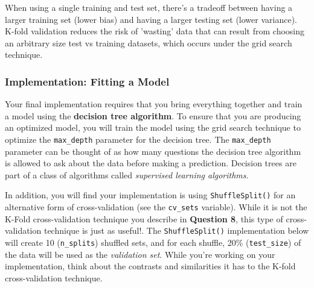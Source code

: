 \documentclass[11pt]{article}
\begin{document}
When using a single training and test set, there's a tradeoff between
having a larger training set (lower bias) and having a larger testing
set (lower variance). K-fold validation reduces the risk of 'wasting'
data that can result from choosing an arbitrary size test vs training
datasets, which occurs under the grid search technique.

    \subsubsection{Implementation: Fitting a
Model}\label{implementation-fitting-a-model}

Your final implementation requires that you bring everything together
and train a model using the \textbf{decision tree algorithm}. To ensure
that you are producing an optimized model, you will train the model
using the grid search technique to optimize the
\texttt{\textquotesingle{}max\_depth\textquotesingle{}} parameter for
the decision tree. The
\texttt{\textquotesingle{}max\_depth\textquotesingle{}} parameter can be
thought of as how many questions the decision tree algorithm is allowed
to ask about the data before making a prediction. Decision trees are
part of a class of algorithms called \emph{supervised learning
algorithms}.

In addition, you will find your implementation is using
\texttt{ShuffleSplit()} for an alternative form of cross-validation (see
the \texttt{\textquotesingle{}cv\_sets\textquotesingle{}} variable).
While it is not the K-Fold cross-validation technique you describe in
\textbf{Question 8}, this type of cross-validation technique is just as
useful!. The \texttt{ShuffleSplit()} implementation below will create 10
(\texttt{\textquotesingle{}n\_splits\textquotesingle{}}) shuffled sets,
and for each shuffle, 20\%
(\texttt{\textquotesingle{}test\_size\textquotesingle{}}) of the data
will be used as the \emph{validation set}. While you're working on your
implementation, think about the contrasts and similarities it has to the
K-fold cross-validation technique.
\end{document}
